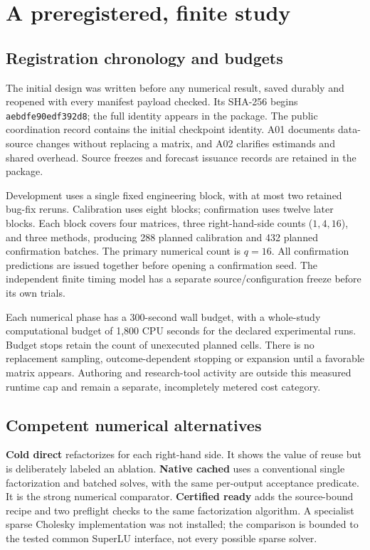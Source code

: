 \documentclass[11pt,a4paper]{article}
\begin{document}
\section{A preregistered, finite study}
\subsection{Registration chronology and budgets}
The initial design was written before any numerical result, saved durably and reopened with every manifest payload checked. Its SHA-256 begins \texttt{aebdfe90edf392d8}; the full identity appears in the package. The public coordination record contains the initial checkpoint identity. \citep{registration2026} A01 documents data-source changes without replacing a matrix, and A02 clarifies estimands and shared overhead. Source freezes and forecast issuance records are retained in the package.

Development uses a single fixed engineering block, with at most two retained bug-fix reruns. Calibration uses eight blocks; confirmation uses twelve later blocks. Each block covers four matrices, three right-hand-side counts ($1,4,16$), and three methods, producing 288 planned calibration and 432 planned confirmation batches. The primary numerical count is $q=16$. All confirmation predictions are issued together before opening a confirmation seed. The independent finite timing model has a separate source/configuration freeze before its own trials.

Each numerical phase has a 300-second wall budget, with a whole-study computational budget of 1,800 CPU seconds for the declared experimental runs. Budget stops retain the count of unexecuted planned cells. There is no replacement sampling, outcome-dependent stopping or expansion until a favorable matrix appears. Authoring and research-tool activity are outside this measured runtime cap and remain a separate, incompletely metered cost category.

\subsection{Competent numerical alternatives}
\textbf{Cold direct} refactorizes for each right-hand side. It shows the value of reuse but is deliberately labeled an ablation. \textbf{Native cached} uses a conventional single factorization and batched solves, with the same per-output acceptance predicate. It is the strong numerical comparator. \textbf{Certified ready} adds the source-bound recipe and two preflight checks to the same factorization algorithm. A specialist sparse Cholesky implementation was not installed; the comparison is bounded to the tested common SuperLU interface, not every possible sparse solver.
\end{document}
